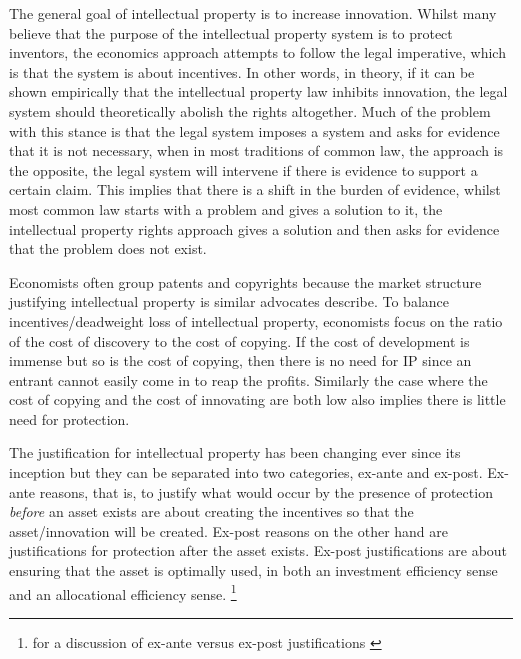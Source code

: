 \documentclass[12pt]{article}
\numberwithin{equation}{section}
\begin{document}
The general goal of intellectual property is to increase innovation. Whilst many believe that the purpose of the intellectual property system is to protect inventors, the economics approach attempts to follow the legal imperative, which is that the system is about incentives. In other words, in theory, if it can be shown empirically that the intellectual property law inhibits innovation, the legal system should theoretically abolish the rights altogether. Much of the problem with this stance is that the legal system imposes a system and asks for evidence that it is not necessary, when in most traditions of common law, the approach is the opposite, the legal system will intervene if there is evidence to support a certain claim. This implies that there is a shift in the burden of evidence, whilst most common law starts with a problem and gives a solution to it, the intellectual property rights approach gives a solution and then asks for evidence that the problem does not exist. 

Economists often group patents and copyrights because the market structure justifying intellectual property is similar advocates describe. To balance incentives/deadweight loss of intellectual property, economists focus on the ratio of the cost of discovery to the cost of copying. If the cost of development is immense but so is the cost of copying, then there is no need for IP since an entrant cannot easily come in to reap the profits. Similarly the case where the cost of copying and the cost of innovating are both low also implies there is little need for protection. 


The justification for intellectual property has been changing ever since its inception but they can be separated into two categories, ex-ante and ex-post. Ex-ante reasons, that is, to justify what would occur by the presence of protection \textit{before} an asset exists are about creating the incentives so that the asset/innovation will be created. Ex-post reasons on the other hand are justifications for protection after the asset exists. Ex-post justifications are about ensuring that the asset is optimally used, in both an investment efficiency sense and an allocational efficiency sense. \footnote{for a discussion of ex-ante versus ex-post justifications \cite{Lemleyt2004}}
\end{document}
